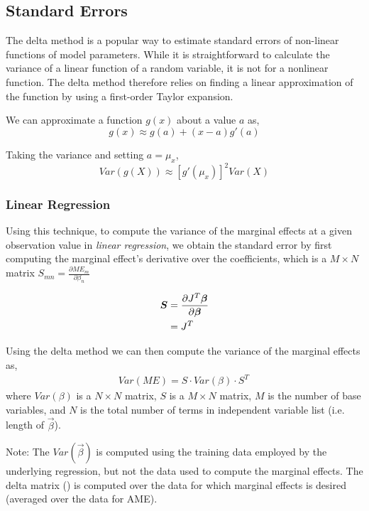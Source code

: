 \subsection{Standard Errors} %
\label{sub:standard_errors}
The delta method is a popular way to estimate standard errors of non-linear
functions of model parameters. While it is straightforward to calculate the
variance of a linear function of a random variable, it is not for a nonlinear
function. The delta method therefore relies on finding a linear approximation
of the function by using a first-order Taylor expansion.

We can approximate a function $g(x)$ about a value $a$ as,
\[ g(x) \approx g(a) + (x-a)g'(a) \]

Taking the variance and setting $a = \mu_x$,
\[ Var(g(X)) \approx \left[g'(\mu_x)\right]^2 Var(X) \]

\subsubsection*{Linear Regression} %
\label{ssub:std_linear_regression}
Using this technique, to compute the variance of the marginal effects
at a given observation value in \emph{linear regression}, we obtain
the standard error by first computing the marginal effect's derivative
over the coefficients, which is a $M\times N$ matrix $S_{mn}
= \frac{\partial \mathit{ME}_m}{\partial \beta_n}$

\begin{align*}
    \vec{S} &= \pder[J^T \vec{\beta}]{\vec{\beta}} \\
            &= J^T
\end{align*}

Using the delta method we can then compute the variance of the marginal effects
as,
\begin{align*}
  Var(\mathit{ME}) = S \cdot Var(\beta)\cdot S^T\,
\end{align*}
where $Var(\beta)$ is a $N\times N$ matrix, $S$ is a $M\times N$
matrix, $M$ is the number of base variables, and $N$ is the total number of
terms in independent variable list (i.e. length of $\vec{\beta}$).

Note: The $Var(\vec{\beta})$ is computed using the training data
employed by the underlying regression, but not the data used to compute the
marginal effects. The delta matrix () is computed over the
data for which marginal effects is desired (averaged over the data for AME).

